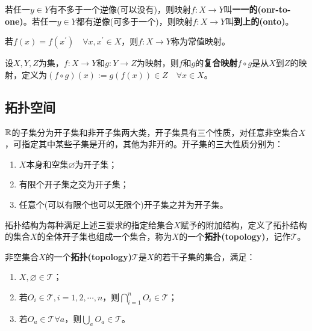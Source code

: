 \documentclass[a4paper]{article}
\begin{document}
\begin{ndefi}
    若任一$ y \in Y $有不多于一个逆像(可以没有)，则映射$ f: X \to Y $叫\textbf{一一的(onr-to-one)}。若任一$ y \in Y $都有逆像(可多于一个)，则映射$ f:X \to Y $叫\textbf{到上的(onto)}。
\end{ndefi}

\begin{ndefi}
    若$ f(x)=f(x^{'}) \quad \forall x,x^{'} \in X $，则$ f:X \to Y $称为常值映射。
\end{ndefi}

\begin{ndefi}
    设$ X,Y,Z $为集，$ f: X \to Y $和$ g:Y \to Z $为映射，则$ f $和$ g $的\textbf{复合映射$ f \circ g $}是从$ X $到$ Z $的映射，定义为$ (f \circ g)(x):=g(f(x)) \in Z \quad \forall x \in X $。
\end{ndefi}


\subsection{拓扑空间}

\begin{concept}
    $ \mathbb{R} $的子集分为开子集和非开子集两大类，开子集具有三个性质，对任意非空集合$ X $，可指定其中某些子集是开的，其他为非开的。开子集的三大性质分别为：
    \begin{enumerate}
        \item $ X $本身和空集$ \varnothing $为开子集；
        \item 有限个开子集之交为开子集；
        \item 任意个(可以有限个也可以无限个)开子集之并为开子集。
    \end{enumerate}
\end{concept}

\begin{concept}
    拓扑结构为每种满足上述三要求的指定给集合$ X $赋予的附加结构，定义了拓扑结构的集合$ X $的全体开子集也组成一个集合，称为$ X $的一个\textbf{拓扑(topology)}，记作$ \mathcal{T}  $。
\end{concept}

\begin{ndefi}
    非空集合$ X $的一个\textbf{拓扑(topology)}$ \mathcal{T} $是$ X $的若干子集的集合，满足：
    \begin{enumerate}
        \item $ X, \varnothing \in \mathcal{T} $；
        \item 若$ O_{i} \in \mathcal{T}, i=1,2,\cdots,n $，则$ \bigcap_{i=1}^{n} O_{i} \in \mathcal{T} $；
        \item 若$ O_{a} \in \mathcal{T} \forall a $，则$ \bigcup_{a} O_{a} \in \mathcal{T} $。
    \end{enumerate}
\end{ndefi}
\end{document}
